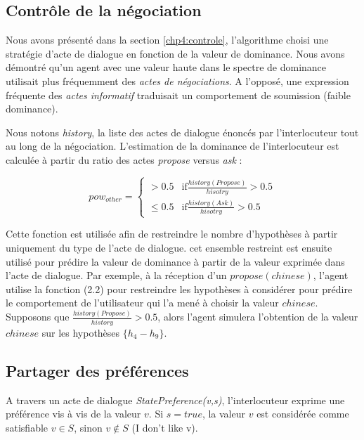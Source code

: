	\subsection{Contrôle de la négociation}	
	
	Nous avons présenté dans la section \ref{chp4:controle}, l'algorithme  choisi une stratégie d'acte de dialogue en fonction de la valeur de dominance. Nous avons démontré qu'un agent avec une valeur haute dans le spectre de dominance utilisait plus fréquemment des \emph{actes de négociations}. A l'opposé, une expression fréquente des \emph{actes informatif} traduisait un comportement de soumission (faible dominance). 
	
	Nous notons \textit{history}, la liste des actes de dialogue énoncés par l'interlocuteur tout au long de la négociation. L'estimation de la dominance de l'interlocuteur est calculée à partir du ratio des actes \emph{propose} versus \emph{ask} :
	
	\begin{equation}
	pow_{other} = \left\{\begin{array}{ll}
	> 0.5 & \mathrm{if } \frac{history(Propose)}{hisotry} > 0.5\\
	\leq 0.5 & \mathrm{if  } \frac{history(Ask)}{hisotry} > 0.5
	\end{array}\right.
	\end{equation}
	
	Cette fonction est utilisée afin de restreindre le nombre d'hypothèses à partir uniquement du type de l'acte de dialogue. cet ensemble restreint est ensuite utilisé pour prédire la valeur de dominance à partir de la valeur exprimée dans l'acte de dialogue. Par exemple, à la réception d'un $propose(chinese)$, l'agent utilise la fonction (2.2) pour restreindre les hypothèses à considérer pour prédire le comportement de l'utilisateur qui l'a mené à choisir la valeur $chinese$. Supposons que $\frac{history(Propose)}{history} > 0.5$, alors l'agent simulera l'obtention de la valeur $chinese$ sur les hypothèses $\{h_4 - h_9\}$.
	

\subsection{Partager des préférences}
A travers un acte de dialogue \emph{StatePreference(v,s)}, l'interlocuteur exprime une préférence vis à vis de la valeur $v$. Si $s =true$, la valeur $v$ est considérée comme satisfiable $v \in S$, sinon $v \not \in S$ (I don't like v). 

